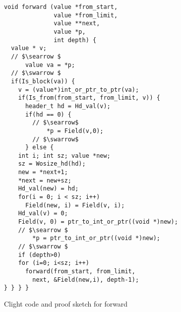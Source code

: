 
\begin{figure}[t]
\vspace{-1ex}
  \begin{lstlisting}
void forward (value *from_start,
              value *from_limit,  
              value **next,       
              value *p,
              int depth) {
  value * v;
  // $\searrow $
      value va = *p;
  // $\swarrow $  
  if(Is_block(va)) {
    v = (value*)int_or_ptr_to_ptr(va);
    if(Is_from(from_start, from_limit, v)) {
      header_t hd = Hd_val(v);
      if(hd == 0) {
        // $\searrow$
            *p = Field(v,0);
        // $\swarrow$
      } else {
    int i; int sz; value *new;
    sz = Wosize_hd(hd);
    new = *next+1;
    *next = new+sz;
    Hd_val(new) = hd;
    for(i = 0; i < sz; i++)
      Field(new, i) = Field(v, i); 
    Hd_val(v) = 0;
    Field(v, 0) = ptr_to_int_or_ptr((void *)new);
    // $\searrow $
        *p = ptr_to_int_or_ptr((void *)new);
    // $\swarrow $
    if (depth>0)
    for (i=0; i<sz; i++)
      forward(from_start, from_limit, 
        next, &Field(new,i), depth-1);
} } } }
\end{lstlisting}

\vspace{-0.4em}
\caption{Clight code and proof sketch for forward}
\label{fig:forward}
\vspace{-1em}
\end{figure}